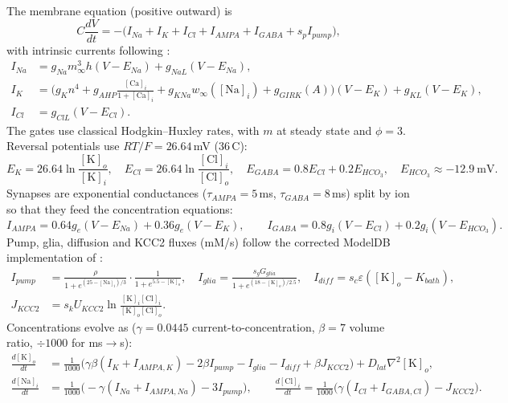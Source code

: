The membrane equation (positive outward) is
\begin{equation}
C\frac{dV}{dt} = -\big(I_{Na} + I_K + I_{Cl} + I_{AMPA} + I_{GABA} + s_p I_{pump}\big),
\end{equation}
with intrinsic currents following \cite{cressman2009}:
\begin{align}
I_{Na} &= g_{Na} m_\infty^3 h (V-E_{Na}) + g_{NaL}(V-E_{Na}),\\
I_K &= \Big(g_K n^4 + g_{AHP}\tfrac{[\mathrm{Ca}]_i}{1+[\mathrm{Ca}]_i} + g_{KNa}w_\infty([\mathrm{Na}]_i) + g_{GIRK}(A)\Big)(V-E_K) + g_{KL}(V-E_K),\\
I_{Cl} &= g_{ClL}(V-E_{Cl}).
\end{align}
The gates use classical Hodgkin--Huxley rates, with $m$ at steady state and $\phi=3$. Reversal potentials use $RT/F=26.64$\,mV (36\,\textdegree C):
\begin{equation}
E_K = 26.64\ln\frac{[\mathrm{K}]_o}{[\mathrm{K}]_i},\quad
E_{Cl} = 26.64\ln\frac{[\mathrm{Cl}]_i}{[\mathrm{Cl}]_o},\quad
E_{GABA} = 0.8E_{Cl} + 0.2E_{HCO_3},\quad E_{HCO_3}\approx-12.9\ \mathrm{mV}.
\end{equation}
Synapses are exponential conductances ($\tau_{AMPA}=5$\,ms, $\tau_{GABA}=8$\,ms) split by ion so that they feed the concentration equations:
\begin{equation}
I_{AMPA} = 0.64g_e(V-E_{Na}) + 0.36g_e(V-E_K),\qquad I_{GABA} = 0.8g_i(V-E_{Cl}) + 0.2g_i(V-E_{HCO_3}).
\end{equation}
Pump, glia, diffusion and KCC2 fluxes (mM/s) follow the corrected ModelDB implementation of \cite{cressman2009}:
\begin{align}
I_{pump} &= \frac{\rho}{1+e^{(25-[\mathrm{Na}]_i)/3}}\cdot\frac{1}{1+e^{5.5-[\mathrm{K}]_o}},\quad
I_{glia} = \frac{s_g G_{glia}}{1+e^{(18-[\mathrm{K}]_o)/2.5}},\quad
I_{diff} = s_c\varepsilon([\mathrm{K}]_o - K_{bath}),\\
J_{KCC2} &= s_k U_{KCC2}\ln\frac{[\mathrm{K}]_i[\mathrm{Cl}]_i}{[\mathrm{K}]_o[\mathrm{Cl}]_o}.
\end{align}
Concentrations evolve as ($\gamma=0.0445$ current-to-concentration, $\beta=7$ volume ratio, $\div1000$ for ms$\to$s):
\begin{align}
\frac{d[\mathrm{K}]_o}{dt} &= \tfrac{1}{1000}\big(\gamma\beta(I_K+I_{AMPA,K}) - 2\beta I_{pump} - I_{glia} - I_{diff} + \beta J_{KCC2}\big) + D_{lat}\nabla^2[\mathrm{K}]_o,\\
\frac{d[\mathrm{Na}]_i}{dt} &= \tfrac{1}{1000}\big(-\gamma(I_{Na}+I_{AMPA,Na}) - 3I_{pump}\big),\qquad
\frac{d[\mathrm{Cl}]_i}{dt} = \tfrac{1}{1000}\big(\gamma(I_{Cl}+I_{GABA,Cl}) - J_{KCC2}\big).
\end{align}
